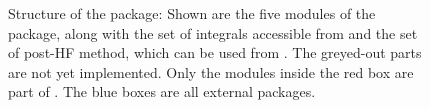 \begin{figure}
	\caption{Structure of the \molsturm package: Shown are the five modules of the package,
	along with the set of integrals accessible from \gint and the set of post-HF method,
	which can be used from \molsturm. The greyed-out parts are not yet implemented.
	Only the modules inside the red box are part of \molsturm. The blue boxes are all external packages.}
	\label{fig:structure}
\end{figure}

%
% 
%





